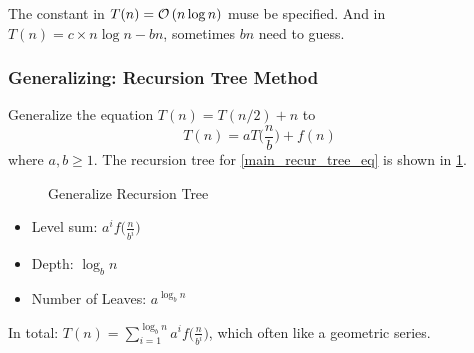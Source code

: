 \Note The constant in $T(n) = \mathcal{O}\left(n\log n\right)$ muse be specified.
And in $T(n) = c\times n\log n - bn$, sometimes $bn$ need to guess.

\subsubsection{Generalizing: Recursion Tree Method}
Generalize the equation $T(n) = T(n/2) + n$ to
\begin{equation}\label{main_recur_tree_eq}
    T(n) = a T\big(\frac{n}{b}\big) + f(n)
\end{equation}
where $a,b \geq 1$. The recursion tree for \cref{main_recur_tree_eq} is shown in \cref{main_recur_tree}.

\begin{figure}[H]
    \caption{Generalize Recursion Tree}\label{main_recur_tree}
    \centering
{}
\end{figure}

\vspace{1in}
\observation

\begin{itemize}
    \item Level sum:  $\displaystyle a^i f\big(\frac{n}{b^i}\big)$
    \item Depth:      $\log_b n$
    \item Number of Leaves:    $a^{\log_b n}$
\end{itemize}

In total: $T(n) = \displaystyle \sum_{i=1}^{\log_b n} a^if\big(\frac{n}{b^i}\big)$, which often like a geometric series.

